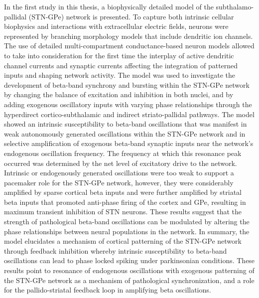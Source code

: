 %
In the first study in this thesis, a biophysically detailed model of the
subthalamo-pallidal (STN-GPe) network is presented. To capture both intrinsic cellular
biophysics and interactions with extracellular electric fields, neurons were represented
by branching morphology models that include dendritic ion channels. The use of detailed
multi-compartment conductance-based neuron models allowed to take into consideration
for the first time the interplay of active dendritic channel currents and synaptic
currents affecting the integration of patterned inputs and shaping network activity.
%
%
The model was used to investigate the development of beta-band synchrony and bursting within the STN-GPe network by changing the balance of excitation and inhibition in both nuclei, and by adding exogenous oscillatory inputs with varying phase relationships through the hyperdirect cortico-subthalamic and indirect striato-pallidal pathways. The model showed an intrinsic susceptibility to beta-band oscillations that was manifest in weak autonomously generated oscillations within the STN-GPe network and in selective amplification of exogenous beta-band synaptic inputs near the network's endogenous oscillation frequency. The frequency at which this resonance peak occurred was determined by the net level of excitatory drive to the network. Intrinsic or endogenously generated oscillations were too weak to support a pacemaker role for the STN-GPe network, however, they were considerably amplified by sparse cortical beta inputs and were further amplified by striatal beta inputs that promoted anti-phase firing of the cortex and GPe, resulting in maximum transient inhibition of STN neurons. 
These results suggest that the strength of pathological beta-band oscillations can be modulated
by altering the phase relationships between neural populations in the network.
In summary, the model elucidates a mechanism of cortical patterning of the STN-GPe network through feedback inhibition whereby intrinsic susceptibility to beta-band oscillations can lead to phase locked spiking under parkinsonian conditions. These results point to resonance of endogenous oscillations with exogenous patterning of the STN-GPe network as a mechanism of pathological synchronization, and a role for the pallido-striatal feedback loop in amplifying beta oscillations.
%
%
%
%
%
%
%
%
%
%
%
%

